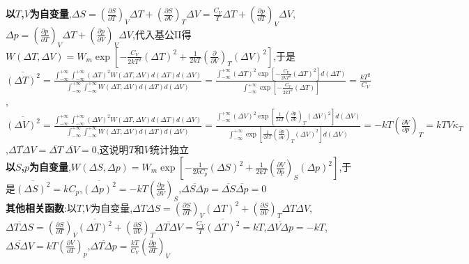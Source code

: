 \documentclass[10pt,a4paper]{article}
\begin{document}
\begin{multicols}{2}
\textbf{以$T$,$V$为自变量},$\Delta S=\left(\frac{\partial S}{\partial T}\right)_V\Delta T+\left(\frac{\partial S}{\partial V}\right)_T\Delta V=\frac{C_V}{T}\Delta T+\left(\frac{\partial p}{\partial T}\right)_V\Delta V$,$\Delta p=\left(\frac{\partial p}{\partial T}\right)_V\Delta T+\left(\frac{\partial p}{\partial V}\right)_V\Delta V$,代入基公II得$W(\Delta T,\Delta V)=W_m\exp\left[-\frac{C_V}{2kT^2}(\Delta T)^2+\frac{1}{2kT}\left(\frac{\partial}{\partial V}\right)_T(\Delta V)^2\right]$,于是$\overline{(\Delta T)^2}=\frac{\int_{-\infty}^{+\infty}\int_{-\infty}^{+\infty}(\Delta T)^2W(\Delta T,\Delta V)d(\Delta T)d(\Delta V)}{\int_{-\infty}^{+\infty}\int_{-\infty}^{+\infty}W(\Delta T,\Delta V)d(\Delta T)d(\Delta V)}=\frac{\int_{-\infty}^{+\infty}(\Delta T)^2\exp\left[-\frac{C_V}{2kT^2}(\Delta T)^2\right]d(\Delta T)}{\int_{-\infty}^{+\infty}\exp\left[-\frac{C_V}{2kT^2}(\Delta T)\right]}=\frac{kT^2}{C_V}$,$\overline{(\Delta V)^2}=\frac{\int_{-\infty}^{+\infty}\int_{-\infty}^{+\infty}(\Delta V)^2W(\Delta T,\Delta V)d(\Delta T)d(\Delta V)}{\int_{-\infty}^{+\infty}\int_{-\infty}^{+\infty}W(\Delta T,\Delta V)d(\Delta T)d(\Delta V)}=\frac{\int_{-\infty}^{+\infty}(\Delta V)^2\exp\left[\frac{1}{2kT}\left(\frac{\partial p}{\partial V}\right)_T(\Delta V)^2\right]d(\Delta V)}{\int_{-\infty}^{+\infty}\exp\left[\frac{1}{2kT}\left(\frac{\partial p}{\partial V}\right)_T(\Delta V)^2\right]d(\Delta V)}=-kT\left(\frac{\partial V}{\partial p}\right)_T=kTV\kappa_T$,$\overline{\Delta T\Delta V}=\overline{\Delta T}~\overline{\Delta V}=0$,这说明$T$和$V$统计独立\\
\textbf{以$S$,$p$为自变量},$W(\Delta S,\Delta p)=W_m\exp\left[-\frac{1}{2kC_p}(\Delta S)^2+\frac{1}{2kT}\left(\frac{\partial V}{\partial p}\right)_S(\Delta p)^2\right]$,于是$\overline{(\Delta S)^2}=kC_p$,$\overline{(\Delta p)^2}=-kT\left(\frac{\partial p}{\partial V}\right)_S$,$\overline{\Delta S\Delta p}=\overline{\Delta S}\overline{\Delta p}=0$\\
\textbf{其他相关函数}:以$T$,$V$为自变量,$\Delta T\Delta S=\left(\frac{\partial S}{\partial T}\right)_V(\Delta T)^2+\left(\frac{\partial S}{\partial V}\right)_T\Delta T\Delta V$,$\overline{\Delta T\Delta S}=\left(\frac{\partial S}{\partial T}\right)_V\overline{(\Delta T)^2}+\left(\frac{\partial S}{\partial V}\right)_T\overline{\Delta T\Delta V}=\frac{C_V}{T}\overline{(\Delta T)^2}=kT$,$\overline{\Delta V\Delta p}=-kT$,$\overline{\Delta S\Delta V}=kT\left(\frac{\partial V}{\partial T}\right)_p$,$\overline{\Delta T\Delta p}=\frac{kT}{C_V}\left(\frac{\partial p}{\partial T}\right)_V$\\

\end{multicols}
\end{document}
